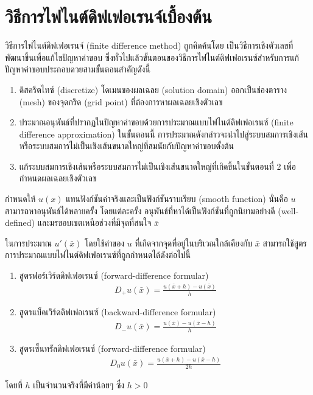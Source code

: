 \section{วิธีการไฟไนต์ดิฟเฟอเรนจ์เบื้องต้น}
\hspace{1cm}

\hspace{1cm} วิธีการไฟไนต์ดิฟเฟอเรนจ์ (finite difference method) ถูกคิดค้นโดย เป็นวิธีการเชิงตัวเลขที่พัฒนาขึ้นเพื่อแก้ไขปัญหาค่าขอบ ซึ่งทั่วไปแล้วขั้นตอนของวิธีการไฟไนต์ดิฟเฟอเรนซ์สำหรับการแก้ปัญหาค่าขอบประกอบดวยสามขั้นตอนสำคัญดังนี้

\begin{enumerate}
    \item ดิสครีตไทซ์ (discretize) โดเมนของผลเฉลย (solution domain) ออกเป็นช่องตาราง (mesh) ของจุดกริด (grid point) ที่ต้องการหาผลเฉลยเชิงตัวเลข
    \item ประมาณอนุพันธ์ที่ปรากฏในปัญหาค่าขอบด้วยการประมาณแบบไฟไนต์ดิฟเฟอเรนซ์ (finite difference approximation) ในขั้นตอนนี้ การประมาณดังกล่าวจะนำไปสู่ระบบสมการเชิงเส้น หรือระบบสมการไม่เป็นเชิงเส้นขนาดใหญ่ที่สมนัยกับปัญหาค่าขอบตั้งต้น
    \item แก้ระบบสมการเชิงเส้นหรือระบบสมการไม่เป็นเชิงเส้นขนาดใหญ่ที่เกิดขึ้นในขั้นตอนที่ 2 เพื่อกำหนดผลเฉลยเชิงตัวเลข
\end{enumerate}

\hspace{1cm} กำหนดให้ $u(x)$ แทนฟังก์ชันค่าจริงและเป็นฟังก์ชันราบเรียบ (smooth function) นั่นคือ $u$ สามารถหาอนุพันธ์ได้หลายครั้ง โดยแต่ละครั้ง อนุพันธ์ที่หาได้เป็นฟังก์ชันที่ถูกนิยามอย่างดี (well-defined) และมรขอบเขตเหนือช่วงที่มีจุดที่สนใจ $\bar{x}$

\hspace{1cm} ในการประมาณ $u'(\bar{x})$ โดยใช้ค่าของ $u$ ที่เกิดจากจุดที่อยู่ในบริเวณใกล้เคียงกับ $\bar{x}$ สามารถใช้สูตรการประมาณแบบไฟไนต์ดิฟเฟอเรนซ์ที่ถูกกำหนดได้ดังต่อไปนี้
\begin{enumerate}
    \item สูตรฟอร์เวิร์ดดิฟเฟอเรนซ์ (forward-difference formular) 
    \begin{align*}
        D_{+}u(\bar{x}) = \frac{u(\bar{x}+h) - u(\bar{x})}{h}    
    \end{align*}
    \item สูตรแบ็คเวิร์ดดิฟเฟอเรนซ์ (backward-difference formular) 
    \begin{align*}
        D_{-}u(\bar{x}) = \frac{u(\bar{x}) - u(\bar{x}-h)}{h}    
    \end{align*}
    \item สูตรเซ็นทรัลดิฟเฟอเรนซ์ (forward-difference formular) 
    \begin{align*}
        D_{0}u(\bar{x}) = \frac{u(\bar{x}+h) - u(\bar{x}-h)}{2h}    
    \end{align*}
\end{enumerate}
โดยที่ $h$ เป็นจำนวนจริงที่มีค่าน้อยๆ ซึ่ง $h>0$ 

